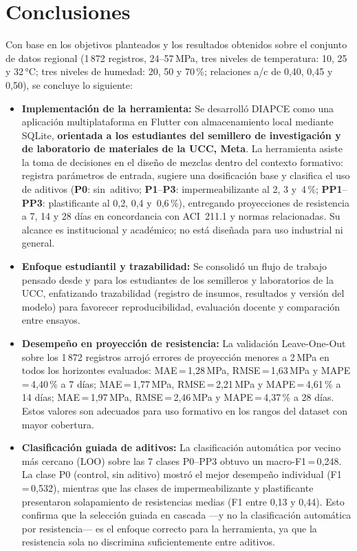 \section{Conclusiones}

Con base en los objetivos planteados y los resultados obtenidos sobre el conjunto de datos regional (1\,872 registros, 24--57\,MPa, tres niveles de temperatura: 10, 25 y 32\,°C; tres niveles de humedad: 20, 50 y 70\,\%; relaciones a/c de 0{,}40, 0{,}45 y 0{,}50), se concluye lo siguiente:

\begin{itemize}
  \item \textbf{Implementación de la herramienta:} Se desarrolló DIAPCE como una aplicación multiplataforma en Flutter con almacenamiento local mediante SQLite, \textbf{orientada a los estudiantes del semillero de investigación y de laboratorio de materiales de la UCC, Meta}. La herramienta asiste la toma de decisiones en el diseño de mezclas dentro del contexto formativo: registra parámetros de entrada, sugiere una dosificación base y clasifica el uso de aditivos (\textbf{P0}: sin~aditivo; \textbf{P1}--\textbf{P3}: impermeabilizante al 2, 3 y~4\,\%; \textbf{PP1}--\textbf{PP3}: plastificante al 0{,}2, 0{,}4 y~0{,}6\,\%), entregando proyecciones de resistencia a 7, 14 y 28 días en concordancia con ACI~211.1 y normas relacionadas. Su alcance es institucional y académico; no está diseñada para uso industrial ni general.

  \item \textbf{Enfoque estudiantil y trazabilidad:} Se consolidó un flujo de trabajo pensado desde y para los estudiantes de los semilleros y laboratorios de la UCC, enfatizando trazabilidad (registro de insumos, resultados y versión del modelo) para favorecer reproducibilidad, evaluación docente y comparación entre ensayos.

  \item \textbf{Desempeño en proyección de resistencia:} La validación Leave-One-Out sobre los 1\,872 registros arrojó errores de proyección menores a 2\,MPa en todos los horizontes evaluados: MAE\,=\,1{,}28\,MPa, RMSE\,=\,1{,}63\,MPa y MAPE\,=\,4{,}40\,\% a 7 días; MAE\,=\,1{,}77\,MPa, RMSE\,=\,2{,}21\,MPa y MAPE\,=\,4{,}61\,\% a 14 días; MAE\,=\,1{,}97\,MPa, RMSE\,=\,2{,}46\,MPa y MAPE\,=\,4{,}37\,\% a 28 días. Estos valores son adecuados para uso formativo en los rangos del dataset con mayor cobertura.

  \item \textbf{Clasificación guiada de aditivos:} La clasificación automática por vecino más cercano (LOO) sobre las 7 clases P0--PP3 obtuvo un macro-F1\,=\,0{,}248. La clase P0 (control, sin aditivo) mostró el mejor desempeño individual (F1\,=\,0{,}532), mientras que las clases de impermeabilizante y plastificante presentaron solapamiento de resistencias medias (F1 entre 0{,}13 y 0{,}44). Esto confirma que la selección guiada en cascada —y no la clasificación automática por resistencia— es el enfoque correcto para la herramienta, ya que la resistencia sola no discrimina suficientemente entre aditivos.


\end{itemize}
